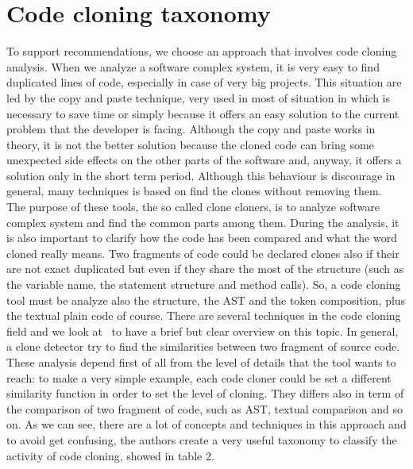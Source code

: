 \section{Code cloning taxonomy}
To support recommendations, we choose an approach that involves code cloning 
analysis. When we analyze a software complex system, it is very easy to find 
duplicated lines of code, especially in case of very big projects. This 
situation are led by the copy and paste technique, very used in most of 
situation in which is necessary to save time or simply because it offers an 
easy solution to the current problem that the developer is facing. Although the 
copy and paste works in theory, it is not the better solution because the 
cloned code can bring some unexpected side effects on the other parts of the 
software and, anyway, it offers a solution only in the short term period. 
Although this behaviour is discourage in general, many techniques is based on 
find the clones without removing them. \\
The purpose of these tools, the so called clone cloners, is to analyze software 
complex system and find the common parts among them. During the analysis, it is 
also important to clarify how the code has been compared and what the word 
cloned really means. Two fragments of code could be declared clones also if 
their are not exact duplicated but even if they share the most of the structure 
(such as the variable name, the statement structure and method calls). So, a 
code cloning tool must be analyze also the structure, the AST and the token 
composition, plus the textual plain code of course. There are several 
techniques in the code cloning field and we look 
at~\cite{chanchal_k._roy_comparison_2009} to have a brief but clear overview on 
this topic. In general, a clone detector try to find the similarities between 
two fragment of source code. These analysis depend first of all from the level 
of details that the tool wants to reach: to make a very simple example, each 
code cloner could be set a different similarity function in order to set the 
level of cloning. They differs also in term of the comparison of two fragment 
of code, such as AST, textual comparison and so on. As we can see, there are a 
lot of concepts and techniques in this approach and to avoid get confusing, the 
authors create a very useful taxonomy to classify the activity of code cloning, 
showed in table 2.

